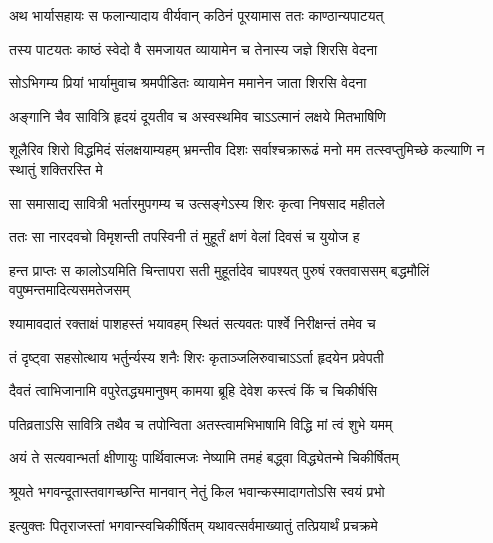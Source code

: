 \begin{center}


\twolineshloka
{अथ भार्यासहायः स फलान्यादाय वीर्यवान्}
{कठिनं पूरयामास ततः काण्ठान्यपाटयत्}


\twolineshloka
{तस्य पाटयतः काष्ठं स्वेदो वै समजायत}
{व्यायामेन च तेनास्य जज्ञे शिरसि वेदना}


\twolineshloka
{सोऽभिगम्य प्रियां भार्यामुवाच श्रमपीडितः}
{व्यायामेन ममानेन जाता शिरसि वेदना}


\twolineshloka
{अङ्गानि चैव सावित्रि हृदयं दूयतीव च}
{अस्वस्थमिव चाऽऽत्मानं लक्षये मितभाषिणि}


\threelineshloka
{शूलैरिव शिरो विद्धमिदं संलक्षयाम्यहम्}
{भ्रमन्तीव दिशः सर्वाश्चक्रारूढं मनो मम}
{तत्स्वप्तुमिच्छे कल्याणि न स्थातुं शक्तिरस्ति मे}


\twolineshloka
{सा समासाद्य सावित्री भर्तारमुपगम्य च}
{उत्सङ्गेऽस्य शिरः कृत्वा निषसाद महीतले}


\twolineshloka
{ततः सा नारदवचो विमृशन्ती तपस्विनी}
{तं मुहूर्तं क्षणं वेलां दिवसं च युयोज ह}


\threelineshloka
{हन्त प्राप्तः स कालोऽयमिति चिन्तापरा सती}
{मुहूर्तादेव चापश्यत् पुरुषं रक्तवाससम्}
{बद्धमौलिं वपुष्मन्तमादित्यसमतेजसम्}


\twolineshloka
{श्यामावदातं रक्ताक्षं पाशहस्तं भयावहम्}
{स्थितं सत्यवतः पार्श्वे निरीक्षन्तं तमेव च}


\twolineshloka
{तं दृष्ट्वा सहसोत्थाय भर्तुर्न्यस्य शनैः शिरः}
{कृताञ्जलिरुवाचाऽऽर्ता हृदयेन प्रवेपती}


\twolineshloka
{दैवतं त्वाभिजानामि वपुरेतद्ध्यमानुषम्}
{कामया ब्रूहि देवेश कस्त्वं किं च चिकीर्षसि}




\twolineshloka
{पतिव्रताऽसि सावित्रि तथैव च तपोन्विता}
{अतस्त्वामभिभाषामि विद्धि मां त्वं शुभे यमम्}


\twolineshloka
{अयं ते सत्यवान्भर्ता क्षीणायुः पार्थिवात्मजः}
{नेष्यामि तमहं बद्ध्वा विद्ध्येतन्मे चिकीर्षितम्}




\twolineshloka
{श्रूयते भगवन्दूतास्तवागच्छन्ति मानवान्}
{नेतुं किल भवान्कस्मादागतोऽसि स्वयं प्रभो}




\twolineshloka
{इत्युक्तः पितृराजस्तां भगवान्स्वचिकीर्षितम्}
{यथावत्सर्वमाख्यातुं तत्प्रियार्थं प्रचक्रमे}



\end{center}
